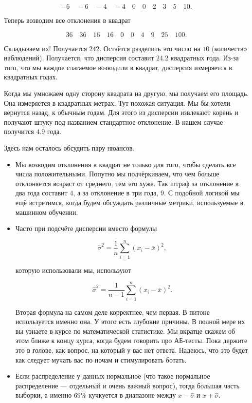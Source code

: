 \documentclass[12pt, a4paper, oneside]{article}
\begin{document}
\begin{enumerate}
	\[
	-6 \quad -6  \quad -4  \quad -4  \quad 0  \quad 0 \quad 2  \quad 3  \quad 5  \quad 10.
	\]
	
	Теперь возводим все отклонения в квадрат
	
	\[
	36 \quad 36  \quad 16  \quad 16 \quad 0  \quad 0 \quad 4  \quad 9 \quad 25  \quad 100.
	\]
	
	Складываем их! Получается $242$. Остаётся разделить это число на  $10$ (количество наблюдений). Получается, что дисперсия составит $24.2$ квадратных года.  Из-за того, что мы каждое слагаемое возводили в квадрат, дисперсия измеряется в квадратных годах.  
	
	Когда мы умножаем одну сторону квадрата на другую, мы получаем его площадь. Она измеряется в квадратных метрах. Тут похожая ситуация. Мы бы хотели вернутся назад, к обычным годам. Для этого из дисперсии извлекают корень и получают штуку под названием стандартное отклонение.  В нашем случае получится $4.9$ года. 
	
	Здесь нам осталось обсудить пару нюансов. 
	
	\begin{itemize}
		\item  Мы возводим отклонения в квадрат не только для того, чтобы сделать все числа положительными. Попутно мы подчёркиваем, что чем больше отклоняется возраст от среднего, тем это хуже. Так штраф за отклонение в два года составит $4$, а за отклонение в три года, $9$.  С подобной логикой мы ещё встретимся, когда будем обсуждать различные метрики, используемые в машинном обучении. 
		
		\item Часто при подсчёте дисперсии вместо формулы 
		
		\[ 
		\hat \sigma^2 = \frac{1}{n} \sum_{i=1}^n (x_i - \bar x)^2,
		\]
		
		которую использовали мы, используют 
		
		\[ 
		\hat \sigma^2 = \frac{1}{n-1} \sum_{i=1}^n (x_i - \bar x)^2.
		\]
		
		Вторая формула на самом деле корректнее, чем первая.  В питоне используется именно она. У этого есть глубокие причины. В полной мере их вы узнаете в курсе по математической статистике. Мы вкратце скажем об этом ближе к концу курса, когда будем говорить про АБ-тесты. Пока держите это в голове, как вопрос, на который у вас нет ответа. Надеюсь, что это будет как следует мучать вас по ночам и стимулировать ботать. 
		
		\item Если распределение у данных нормальное (что такое нормальное распределение --- отдельный и очень важный вопрос), тогда  большая часть выборки, а именно $69\%$ кучкуется в диапазоне между $\bar x - \hat \sigma$ и $\bar x + \hat \sigma$.  
		

\end{itemize}
\end{enumerate}
\end{document}
